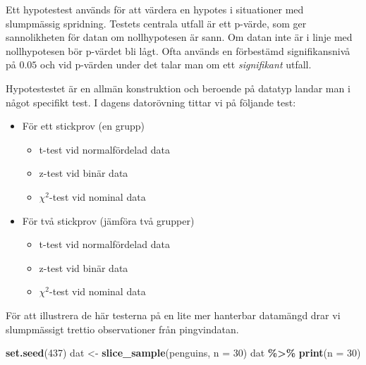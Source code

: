 \documentclass[
]{book}
\newenvironment{Shaded}{\begin{snugshade}}{\end{snugshade}}
\newcommand{\AttributeTok}[1]{\textcolor[rgb]{0.13,0.29,0.53}{#1}}
\newcommand{\DecValTok}[1]{\textcolor[rgb]{0.00,0.00,0.81}{#1}}
\newcommand{\FunctionTok}[1]{\textcolor[rgb]{0.13,0.29,0.53}{\textbf{#1}}}
\newcommand{\NormalTok}[1]{#1}
\newcommand{\OtherTok}[1]{\textcolor[rgb]{0.56,0.35,0.01}{#1}}
\newcommand{\SpecialCharTok}[1]{\textcolor[rgb]{0.81,0.36,0.00}{\textbf{#1}}}
\providecommand{\tightlist}{%
  \setlength{\itemsep}{0pt}\setlength{\parskip}{0pt}}
\theoremstyle{definition}
\theoremstyle{definition}
\theoremstyle{definition}
\theoremstyle{definition}
\theoremstyle{remark}
\begin{document}
Ett hypotestest används för att värdera en hypotes i situationer med slumpmässig spridning. Testets centrala utfall är ett p-värde, som ger sannolikheten för datan om nollhypotesen är sann. Om datan inte är i linje med nollhypotesen bör p-värdet bli lågt. Ofta används en förbestämd signifikansnivå på \(0.05\) och vid p-värden under det talar man om ett \emph{signifikant} utfall.

Hypotestestet är en allmän konstruktion och beroende på datatyp landar man i något specifikt test. I dagens datorövning tittar vi på följande test:

\begin{itemize}
\tightlist
\item
  För ett stickprov (en grupp)

  \begin{itemize}
  \tightlist
  \item
    t-test vid normalfördelad data
  \item
    z-test vid binär data
  \item
    \(\chi^2\)-test vid nominal data
  \end{itemize}
\item
  För två stickprov (jämföra två grupper)

  \begin{itemize}
  \tightlist
  \item
    t-test vid normalfördelad data
  \item
    z-test vid binär data
  \item
    \(\chi^2\)-test vid nominal data
  \end{itemize}
\end{itemize}

För att illustrera de här testerna på en lite mer hanterbar datamängd drar vi slumpmässigt trettio observationer från pingvindatan.

\begin{Shaded}
\begin{Highlighting}[]
\FunctionTok{set.seed}\NormalTok{(}\DecValTok{437}\NormalTok{)}
\NormalTok{dat }\OtherTok{\textless{}{-}} \FunctionTok{slice\_sample}\NormalTok{(penguins, }\AttributeTok{n =} \DecValTok{30}\NormalTok{)}
\NormalTok{dat }\SpecialCharTok{\%\textgreater{}\%} \FunctionTok{print}\NormalTok{(}\AttributeTok{n =} \DecValTok{30}\NormalTok{)}
\end{Highlighting}
\end{Shaded}
\end{document}
